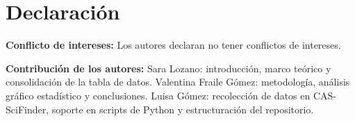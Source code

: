 \documentclass[twoside,twocolumn,10pt]{article}
\begin{document}






\section{Declaración}
\fontsize{11}{13}\selectfont

\textbf{Conflicto de intereses:} Los autores declaran no tener conflictos de intereses.

\textbf{Contribución de los autores:}
Sara Lozano: introducción, marco teórico y consolidación de la tabla de datos.
Valentina Fraile Gómez: metodología, análisis gráfico estadístico y conclusiones.
Luisa Gómez: recolección de datos en CAS-SciFinder, soporte en scripts de Python y estructuración del repositorio.

\printbibliography[title={Referencias}]
\end{document}
